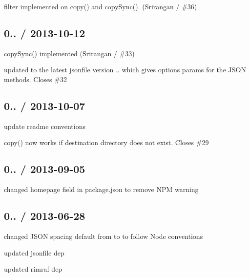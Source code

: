\begin{DoxyItemize}
\item {\ttfamily filter} implemented on {\ttfamily copy()} and {\ttfamily copy\+Sync()}. (Srirangan / \#36)
\end{DoxyItemize}

\subsection*{0.. / 2013-\/10-\/12 }


\begin{DoxyItemize}
\item {\ttfamily copy\+Sync()} implemented (Srirangan / \#33)
\item updated to the latest {\ttfamily jsonfile} version {..} which gives {\ttfamily options} params for the J\+S\+ON methods. Closes \#32
\end{DoxyItemize}

\subsection*{0.. / 2013-\/10-\/07 }


\begin{DoxyItemize}
\item update readme conventions
\item {\ttfamily copy()} now works if destination directory does not exist. Closes \#29
\end{DoxyItemize}

\subsection*{0.. / 2013-\/09-\/05 }


\begin{DoxyItemize}
\item changed {\ttfamily homepage} field in package.\+json to remove N\+PM warning
\end{DoxyItemize}

\subsection*{0.. / 2013-\/06-\/28 }


\begin{DoxyItemize}
\item changed J\+S\+ON spacing default from {} to {} to follow Node conventions
\item updated {\ttfamily jsonfile} dep
\item updated {\ttfamily rimraf} dep
\end{DoxyItemize}

